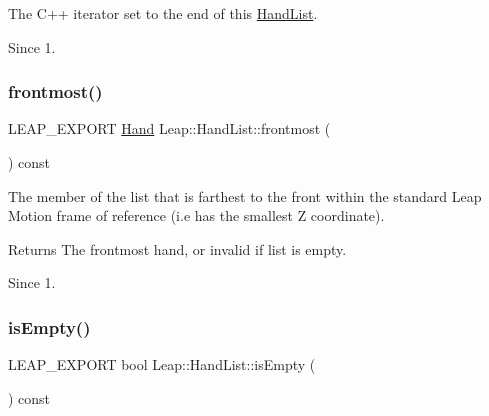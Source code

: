 The C++ iterator set to the end of this \hyperlink{class_leap_1_1_hand_list}{Hand\+List}.


\begin{DoxyCodeInclude}
\end{DoxyCodeInclude}


\begin{DoxySince}{Since}
1. 
\end{DoxySince}
\mbox{\label{class_leap_1_1_hand_list_a25714b1732a5075c51e1acaf202cbe1f}} 
\subsubsection{\texorpdfstring{frontmost()}{frontmost()}}
{\footnotesize\ttfamily L\+E\+A\+P\+\_\+\+E\+X\+P\+O\+RT \hyperlink{class_leap_1_1_hand}{Hand} Leap\+::\+Hand\+List\+::frontmost (\begin{DoxyParamCaption}{ }\end{DoxyParamCaption}) const}

The member of the list that is farthest to the front within the standard Leap Motion frame of reference (i.\+e has the smallest Z coordinate).


\begin{DoxyCodeInclude}
\end{DoxyCodeInclude}


\begin{DoxyReturn}{Returns}
The frontmost hand, or invalid if list is empty. 
\end{DoxyReturn}
\begin{DoxySince}{Since}
1. 
\end{DoxySince}
\mbox{\label{class_leap_1_1_hand_list_a219e6515714fd2466d895a0071894d51}} 
\subsubsection{\texorpdfstring{is\+Empty()}{isEmpty()}}
{\footnotesize\ttfamily L\+E\+A\+P\+\_\+\+E\+X\+P\+O\+RT bool Leap\+::\+Hand\+List\+::is\+Empty (\begin{DoxyParamCaption}{ }\end{DoxyParamCaption}) const}

